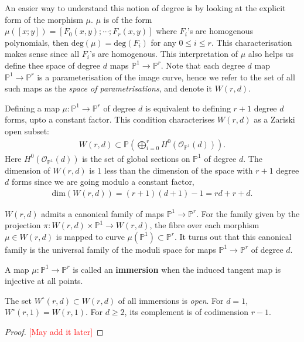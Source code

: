 An easier way to understand this notion of degree is by looking at the explicit form of the morphism $\mu$.
$\mu$ is of the form $\mu([x;y]) = [F_{0}(x,y);\cdots ; F_{r}(x,y)]$ where $F_{i}$'s are homogenous polynomials, then $\text{deg}(\mu) = \text{deg}(F_{i})$ for any $0 \leq i \leq r$. 
This characterisation makes sense since all $F_{i}$'s are homogenous.
This interpretation of $\mu$ also helps us define thee space of degree $d$ maps $\mathbb{P}^{1} \to \mathbb{P}^{r}$.
Note that each degree $d$ map $\mathbb{P}^{1} \to \mathbb{P}^{r}$ is a parameterisation of the image curve, hence we refer to the set of all such maps as the \textit{space of parametrisations}, and denote it $W(r,d)$. 

\par Defining a map $\mu : \mathbb{P}^{1} \to \mathbb{P}^{r}$ of degree $d$ is equivalent to defining $r+1$ degree $d$ forms, upto a constant factor.
This condition characterises $W(r,d)$ as a Zariski open subset:
\begin{align*}
    W(r,d) \subset \mathbb{P}\left(\bigoplus_{i=0}^{r}H^{0}(\mathcal{O}_{\mathbb{P}^{1}}(d)) \right).
\end{align*}
Here $H^{0}(\mathcal{O}_{\mathbb{P}^{1}}(d))$ is the set of global sections on $\mathbb{P}^{1}$ of degree $d$.
The dimension of $W(r,d)$ is $1$ less than the dimension of the space with $r+1$ degree $d$ forms since we are going modulo a constant factor, 
\begin{align*}
    \text{dim}(W(r,d)) = (r+1)(d+1) - 1 = rd + r + d.
\end{align*}
\par $W(r,d)$ admits a canonical family of maps $\mathbb{P}^{1} \to \mathbb{P}^{r}$.
For the family given by the projection $\pi : W(r,d) \times \mathbb{P}^{1} \to W(r,d)$, the fibre over each morphism $\mu \in W(r,d)$ is mapped to curve $\mu(\mathbb{P}^{1}) \subset \mathbb{P}^{r}$.
It turns out that this canonical family is the universal family of the moduli space for maps $\mathbb{P}^{1} \to \mathbb{P}^{r}$ of degree $d$.
\begin{definition}
    A map $\mu :\mathbb{P}^{1} \to \mathbb{P}^{r}$ is called an \textbf{immersion} when the induced tangent map is injective at all points.
\end{definition}
\begin{lemma}
    The set $W^{\circ}(r,d) \subset W(r,d)$ of all immersions is \textit{open}.
    For $d=1$, $W^{\circ}(r,1)  = W(r,1)$. For $d\geq 2$, its complement is of codimension $r-1$.
\end{lemma}
\begin{proof}
    \textcolor{red}{[May add it later]}
\end{proof}

